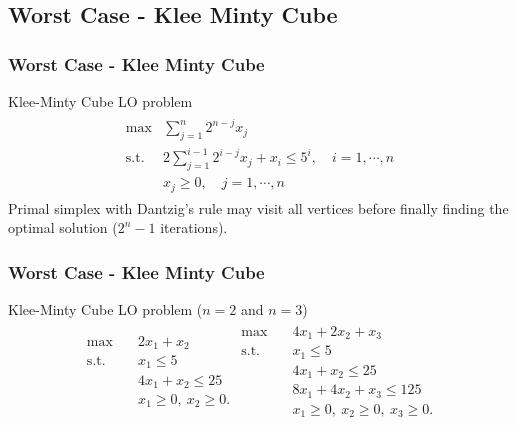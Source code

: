 \documentclass{beamer}
\begin{document}
\subsection{Worst Case - Klee Minty Cube}
\begin{frame}
\frametitle{Worst Case - Klee Minty Cube}
Klee-Minty Cube LO problem
\begin{align*}
\begin{split}
\max &\sum_{j=1}^n 2^{n-j}x_j \\
\text{s.t. } & 2\sum_{j=1}^{i-1}2^{i-j}x_j + x_i \le 5^i, \quad i=1,\cdots,n\\
			&x_j \ge 0,  \quad j=1,\cdots,n
\end{split}
\end{align*} 
Primal simplex with Dantzig's rule may visit all vertices before finally finding the optimal solution ($2^n - 1$ iterations).
\end{frame}


\begin{frame}
\frametitle{Worst Case - Klee Minty Cube}
Klee-Minty Cube LO problem ($n=2$ and $n=3$)
\begin{align*}
\begin{split}
\max \quad & 2x_1 + x_2 \\
\text{s.t. }\quad  & x_1 \le 5\\
& 4x_1 + x_2 \le 25\\
& x_1 \ge 0,\ x_2 \ge 0.
\end{split}
\begin{split}
\max \quad & 4x_1 + 2x_2 + x_3 \\
\text{s.t. }\quad  & x_1 \le 5\\
& 4x_1 + x_2 \le 25\\
& 8x_1 + 4x_2 + x_3 \le 125\\
& x_1 \ge 0,\ x_2 \ge 0, \ x_3 \ge 0.
\end{split}
\end{align*}
\begin{figure}
\end{figure}

\end{frame}
\end{document}
